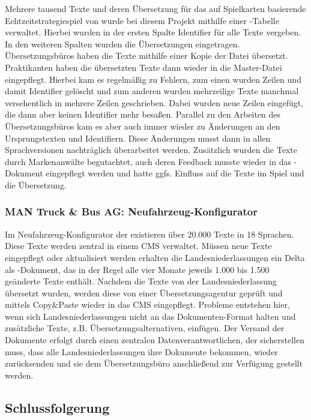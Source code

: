 Mehrere tausend Texte und deren Übersetzung für das auf Spielkarten basierende Echtzeitstrategiespiel  von  wurde bei diesem Projekt mithilfe einer -Tabelle verwaltet. Hierbei wurden in der ersten Spalte Identifier für alle Texte vergeben. In den weiteren Spalten wurden die Übersetzungen eingetragen. Übersetzungsbüros haben die Texte mithilfe einer Kopie der Datei übersetzt. Praktikanten haben die übersetzten Texte dann wieder in die Master-Datei eingepflegt. Hierbei kam es regelmäßig zu Fehlern, zum einen wurden Zeilen und damit Identifier gelöscht und zum anderen wurden mehrzeilige Texte manchmal versehentlich in mehrere Zeilen geschrieben. Dabei wurden neue Zeilen eingefügt, die dann aber keinen Identifier mehr besaßen. Parallel zu den Arbeiten des Übersetzungsbüros kam es aber auch immer wieder zu Änderungen an den Ursprungstexten und Identifiern. Diese Änderungen musst dann in allen Sprachversionen nachträglich überarbeitet werden. Zusätzlich wurden die Texte durch Markenanwälte begutachtet, auch deren Feedback musste wieder in das -Dokument eingepflegt werden und hatte ggfs. Einfluss auf die Texte im Spiel und die Übersetzung.

\subsubsection{MAN Truck \& Bus AG: Neufahrzeug-Konfigurator}

Im Neufahrzeug-Konfigurator der  existieren über 20.000 Texte in 18 Sprachen. Diese Texte werden zentral in einem CMS verwaltet. Müssen neue Texte eingepflegt oder aktualisiert werden erhalten die Landesniederlassungen ein Delta als -Dokument, das in der Regel alle vier Monate jeweils 1.000 bis 1.500 geänderte Texte enthält. Nachdem die Texte von der Landesniederlassung übersetzt wurden, werden diese von einer Übersetzungsagentur geprüft und mittels Copy\&Paste wieder in das CMS eingepflegt.  Probleme entstehen hier, wenn sich Landesniederlassungen nicht an das Dokumenten-Format halten und zusätzliche Texte, z.B. Übersetzungsalternativen, einfügen. Der Versand der Dokumente erfolgt durch einen zentralen Datenverantwortlichen, der sicherstellen muss, dass alle Landesniederlassungen ihre Dokumente bekommen, wieder zurücksenden und sie dem Übersetzungsbüro anschließend zur Verfügung gestellt werden.

\pagebreak

\subsection{Schlussfolgerung}\label{l:schlussfolgerung}

